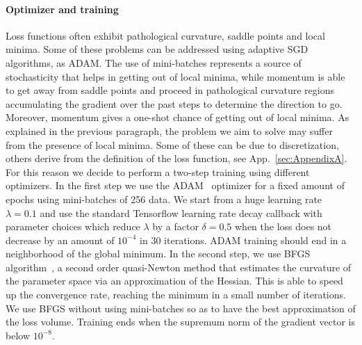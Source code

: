 \documentclass{article}
\begin{document}
\paragraph{Optimizer and training}
Loss functions often exhibit pathological curvature, saddle points and local minima. Some of these problems can be addressed using adaptive SGD algorithms, as ADAM.  The use of mini-batches represents a source of stochasticity that helps in getting out of local minima, while momentum is able to get away from saddle points and proceed in pathological curvature regions accumulating the gradient over the past steps to determine the direction to go. Moreover, momentum gives a one-shot chance of getting out of local minima. As explained in the previous paragraph, the problem we aim to solve may suffer from the presence of local minima. Some of these can be due to discretization, others derive from the definition of the loss function, see App.~\ref{sec:AppendixA}. For this reason we decide to perform a two-step training using different optimizers.
In the first step we use the ADAM~\cite{kingma2014adam} optimizer for a fixed amount of epochs using mini-batches of 256 data. We start from a huge learning rate $\lambda=0.1$ and use the standard Tensorflow learning rate decay callback with parameter choices which reduce $\lambda$ by a factor $\delta=0.5$ when the loss does not decrease by an amount of $10^{-4}$ in $30$ iterations. ADAM training should end in a neighborhood of the global minimum. In the second step, we use BFGS algorithm~\cite{Dennis:1974:CSC,GoodBengCour16}, a second order quasi-Newton method that estimates the curvature of the parameter space via an approximation of the Hessian. This is able to speed up the convergence rate, reaching the minimum in a small number of iterations. We use BFGS without using mini-batches so as to have the best approximation of the loss volume. Training ends when the supremum norm of the gradient vector is below $10^{-8}$.
\end{document}
